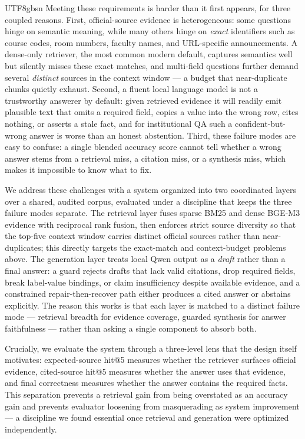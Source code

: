 \documentclass{article}
\begin{document}
\begin{CJK*}{UTF8}{gbsn}
Meeting these requirements is harder than it first appears, for three coupled reasons. First, official-source evidence is heterogeneous: some questions hinge on semantic meaning, while many others hinge on \emph{exact} identifiers such as course codes, room numbers, faculty names, and URL-specific announcements. A dense-only retriever, the most common modern default, captures semantics well but silently misses these exact matches, and multi-field questions further demand several \emph{distinct} sources in the context window --- a budget that near-duplicate chunks quietly exhaust. Second, a fluent local language model is not a trustworthy answerer by default: given retrieved evidence it will readily emit plausible text that omits a required field, copies a value into the wrong row, cites nothing, or asserts a stale fact, and for institutional QA such a confident-but-wrong answer is worse than an honest abstention. Third, these failure modes are easy to confuse: a single blended accuracy score cannot tell whether a wrong answer stems from a retrieval miss, a citation miss, or a synthesis miss, which makes it impossible to know what to fix.

We address these challenges with a system organized into two coordinated layers over a shared, audited corpus, evaluated under a discipline that keeps the three failure modes separate. The retrieval layer fuses sparse BM25 and dense BGE-M3 evidence with reciprocal rank fusion, then enforces strict source diversity so that the top-five context window carries distinct official sources rather than near-duplicates; this directly targets the exact-match and context-budget problems above. The generation layer treats local Qwen output as a \emph{draft} rather than a final answer: a guard rejects drafts that lack valid citations, drop required fields, break label-value bindings, or claim insufficiency despite available evidence, and a constrained repair-then-recover path either produces a cited answer or abstains explicitly. The reason this works is that each layer is matched to a distinct failure mode --- retrieval breadth for evidence coverage, guarded synthesis for answer faithfulness --- rather than asking a single component to absorb both.

Crucially, we evaluate the system through a three-level lens that the design itself motivates: expected-source hit@5 measures whether the retriever surfaces official evidence, cited-source hit@5 measures whether the answer uses that evidence, and final correctness measures whether the answer contains the required facts. This separation prevents a retrieval gain from being overstated as an accuracy gain and prevents evaluator loosening from masquerading as system improvement --- a discipline we found essential once retrieval and generation were optimized independently.


\end{CJK*}
\end{document}
